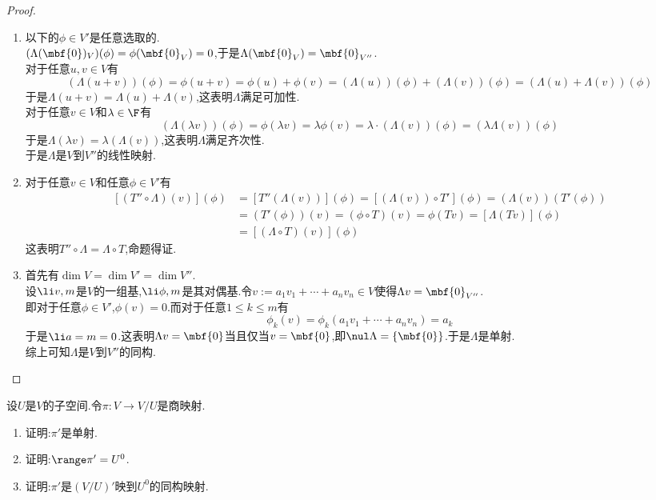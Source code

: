 \documentclass{ctexart}
\begin{document}
\begin{proof}
    \begin{enumerate}[label=\tbf{(\arabic*)}]
        \item 以下的$\phi\in V'$是任意选取的.\\
            $(\Lambda(\mbf{0})_V)(\phi)=\phi(\mbf{0}_V)=0$,于是$\Lambda(\mbf{0}_V)=\mbf{0}_{V''}$.\\
            对于任意$u,v\in V$有
            $$(\Lambda(u+v))(\phi)=\phi(u+v)=\phi(u)+\phi(v)=(\Lambda(u))(\phi)+(\Lambda(v))(\phi)=(\Lambda(u)+\Lambda(v))(\phi)$$
            于是$\Lambda(u+v)=\Lambda(u)+\Lambda(v)$,这表明$\Lambda$满足可加性.\\
            对于任意$v\in V$和$\lambda\in\F$有
            $$(\Lambda(\lambda v))(\phi)=\phi(\lambda v)=\lambda\phi(v)=\lambda\cdot(\Lambda(v))(\phi)=(\lambda\Lambda(v))(\phi)$$
            于是$\Lambda(\lambda v)=\lambda(\Lambda(v))$,这表明$\Lambda$满足齐次性.\\
            于是$\Lambda$是$V$到$V''$的线性映射.
        \item 对于任意$v\in V$和任意$\phi\in V'$有
            $$\begin{aligned}
                \left[(T''\circ\Lambda)(v)\right](\phi)
                &= \left[T''(\Lambda(v))\right](\phi) = [(\Lambda(v))\circ T'](\phi) = (\Lambda(v))(T'(\phi)) \\
                &= (T'(\phi))(v) = (\phi\circ T)(v) = \phi(Tv) = [\Lambda(Tv)](\phi) \\
                &= [(\Lambda\circ T)(v)](\phi)
            \end{aligned}$$
            这表明$T''\circ\Lambda=\Lambda\circ T$,命题得证.
        \item 首先有$\dim V=\dim V'=\dim V''$.\\
            设$\li v,m$是$V$的一组基,$\li\phi,m$是其对偶基.令$v:=a_1v_1+\cdots+a_nv_n\in V$使得$\Lambda v=\mbf{0}_{V''}$.\\
            即对于任意$\phi\in V'$,$\phi(v)=0$.而对于任意$1\leqslant k\leqslant m$有
            $$\phi_k(v)=\phi_k(a_1v_1+\cdots+a_nv_n)=a_k$$
            于是$\li a=m=0$.这表明$\Lambda v=\mbf{0}$当且仅当$v=\mbf{0}$,即$\nul\Lambda=\left\{\mbf{0}\right\}$.于是$\Lambda$是单射.\\
            综上可知$\Lambda$是$V$到$V''$的同构.
    \end{enumerate}
\end{proof}
\begin{problem}[33.]
    设$U$是$V$的子空间.令$\pi:V\to V/U$是商映射.
    \begin{enumerate}[label=\tbf{(\arabic*)}]
        \item 证明:$\pi'$是单射.
        \item 证明:$\range\pi'=U^0$.
        \item 证明:$\pi'$是$(V/U)'$映到$U^0$的同构映射.
    \end{enumerate}
\end{problem}
\end{document}
